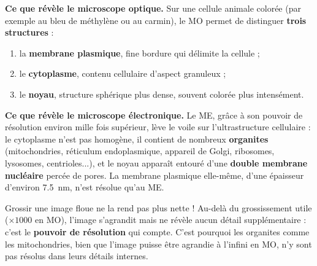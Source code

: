 \documentclass[11pt]{article}
\newcommand{\cle}[1]{{\popxbold\color{popdark}#1}}
\begin{document}
\textbf{Ce que révèle le microscope optique.} Sur une cellule animale colorée (par exemple au bleu de méthylène ou au carmin), le MO permet de distinguer \textbf{trois structures} :

\begin{enumerate}
\item la \textbf{membrane plasmique}, fine bordure qui délimite la cellule ;
\item le \textbf{cytoplasme}, contenu cellulaire d'aspect granuleux ;
\item le \textbf{noyau}, structure sphérique plus dense, souvent colorée plus intensément.
\end{enumerate}

\textbf{Ce que révèle le microscope électronique.} Le ME, grâce à son pouvoir de résolution environ mille fois supérieur, lève le voile sur l'\cle{ultrastructure} cellulaire : le cytoplasme n'est pas homogène, il contient de nombreux \textbf{organites} (mitochondries, réticulum endoplasmique, appareil de Golgi, ribosomes, lysosomes, centrioles...), et le noyau apparaît entouré d'une \textbf{double membrane nucléaire} percée de pores. La membrane plasmique elle-même, d'une épaisseur d'environ \SI{7,5}{nm}, n'est résolue qu'au ME.

\begin{attention}
Grossir une image floue ne la rend pas plus nette ! Au-delà du grossissement utile ($\times 1000$ en MO), l'image s'agrandit mais ne révèle aucun détail supplémentaire : c'est le \textbf{pouvoir de résolution} qui compte. C'est pourquoi les organites comme les mitochondries, bien que l'image puisse être agrandie à l'infini en MO, n'y sont pas résolus dans leurs détails internes.
\end{attention}
\end{document}
